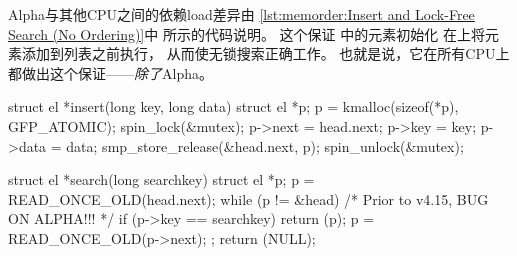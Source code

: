 \begin{fcvref}
Alpha与其他CPU之间的依赖load差异由
\cref{lst:memorder:Insert and Lock-Free Search (No Ordering)}中
所示的代码说明。
这个保证
中的元素初始化
在上将元素添加到列表之前执行，
从而使无锁搜索正确工作。
也就是说，它在所有CPU上都做出这个保证——{\em 除了}Alpha。
\end{fcvref}

\begin{listing}
\begin{fcvlabel}
\begin{VerbatimL}[commandchars=\\\[\]]
struct el *insert(long key, long data)
{
	struct el *p;
	p = kmalloc(sizeof(*p), GFP_ATOMIC);
	spin_lock(&mutex);
	p->next = head.next;		\lnlbl[init:b]
	p->key = key;
	p->data = data;			\lnlbl[init:e]
	smp_store_release(&head.next, p); \lnlbl[add]
	spin_unlock(&mutex);
}

struct el *search(long searchkey)
{
	struct el *p;
	p = READ_ONCE_OLD(head.next);	\lnlbl[h:next]
	while (p != &head) {
		/* Prior to v4.15, BUG ON ALPHA!!! */ \lnlbl[BUG]
		if (p->key == searchkey) {	\lnlbl[key]
			return (p);
		}
		p = READ_ONCE_OLD(p->next);	\lnlbl[next]
	};
	return (NULL);
}
\end{VerbatimL}
\end{fcvlabel}
\caption{插入和无锁搜索（无排序）}
\label{lst:memorder:Insert and Lock-Free Search (No Ordering)}
\end{listing}

